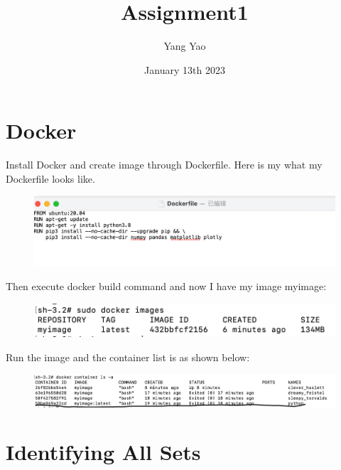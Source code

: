 \documentclass{article}
\title{ Assignment1}
\author{Yang Yao }
\date{January 13th 2023}
\begin{document}
\maketitle

\section{Docker}
Install Docker and create image through Dockerfile.
Here is my what my Dockerfile looks like.
\begin{figure}[H]
\centering
\includegraphics[width=15cm]{images/docker file.png}
\end{figure}

\noindent Then execute docker build command and now I have my image myimage:

\begin{figure}[H]
\centering
\includegraphics{images/image-images.png}
\end{figure}



\noindent Run the image and the container list is as shown below:
\begin{figure}[H]
\centering
\includegraphics[width=15cm] {images/image-containers.png}
\end{figure}

\section{Identifying All Sets}
\end{document}
